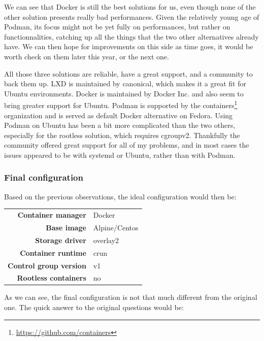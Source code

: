 We can see that Docker is still the best solutions for us, even though none of the other solution presents really bad performances.  Given the relatively young age of Podman, its focus might not be yet fully on performances, but rather on functionnalities, catching up all the things that the two other alternatives already have.  We can then hope for improvements on this side as time goes, it would be worth check on them later this year, or the next one.  

All those three solutions are reliable, have a great support, and a community to back them up.  LXD is maintained by canonical, which makes it a great fit for Ubuntu environments.  Docker is maintained by Docker Inc. and also seem to bring greater support for Ubuntu.  Podman is supported by the containers\footnote{\href{https://github.com/containers}{https://github.com/containers}} organization and is served as default Docker alternative on Fedora.  Using Podman on Ubuntu has been a bit more complicated than the two others, especially for the rootless solution, which requires cgroupv2.  Thankfully the community offered great support for all of my problems, and in most cases the issues appeared to be with systemd or Ubuntu, rather than with Podman.

\subsubsection{Final configuration}

Based on the previous observations, the ideal configuration would then be:

\begin{center}
\begin{tabular}{rl}
  \textbf{Container manager} & Docker \\
  \textbf{Base image} & Alpine/Centos \\
  \textbf{Storage driver} & overlay2 \\
  \textbf{Container runtime} & crun \\
  \textbf{Control group version} & v1 \\
  \textbf{Rootless containers} & no \\
\end{tabular}
\end{center}

As we can see, the final configuration is not that much different from the original one.  The quick answer to the original questions would be:
